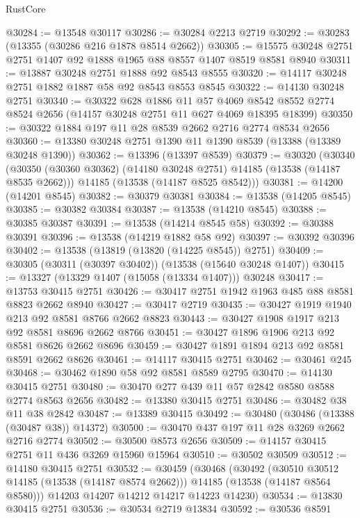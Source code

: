 \begin{lexlean}{RustCore}
\begin{coremodule}
@30284 := @13548 @30117
@30286 := @30284 @2213 @2719
@30292 := @30283 (@13355 (@30286 @216 @1878 @8514 @2662))
@30305 := @15575 @30248 @2751 @2751 @1407 @92 @1888 @1965 @88 @8557 @1407 @8519 @8581 @8940
@30311 := @13887 @30248 @2751 @1888 @92 @8543 @8555
@30320 := @14117 @30248 @2751 @1882 @1887 @58 @92 @8543 @8553 @8545
@30322 := @14130 @30248 @2751
@30340 := @30322
    @628
    @1886
    @11
    @57
    @4069
    @8542
    @8552
    @2774
    @8524
    @2656
    (@14157 @30248 @2751 @11 @627 @4069 @18395 @18399)
@30350 := @30322 @1884 @197 @11 @28 @8539 @2662 @2716 @2774 @8534 @2656
@30360 := @13380 @30248 @2751 @1390 @11 @1390 @8539 (@13388 (@13389 @30248 @1390))
@30362 := @13396 (@13397 @8539)
@30379 := @30320
    (@30340
      (@30350 (@30360 @30362) (@14180 @30248 @2751) @14185 (@13538 (@14187 @8535 @2662)))
      @14185
      (@13538 (@14187 @8525 @8542)))
@30381 := @14200 (@14201 @8545)
@30382 := @30379 @30381
@30384 := @13538 (@14205 @8545)
@30385 := @30382 @30384
@30387 := @13538 (@14210 @8545)
@30388 := @30385 @30387
@30391 := @13538 (@14214 @8545 @58)
@30392 := @30388 @30391
@30396 := @13538 (@14219 @1882 @58 @92)
@30397 := @30392 @30396
@30402 := @13538 (@13819 (@13820 (@14225 @8545)) @2751)
@30409 := @30305 (@30311 (@30397 @30402)) (@13538 (@15640 @30248 @1407))
@30415 := @13327 (@13329 @1407 (@15058 (@13334 @1407))) @30248
@30417 := @13753 @30415 @2751
@30426 := @30417 @2751 @1942 @1963 @485 @88 @8581 @8823 @2662 @8940
@30427 := @30417 @2719
@30435 := @30427 @1919 @1940 @213 @92 @8581 @8766 @2662 @8823
@30443 := @30427 @1908 @1917 @213 @92 @8581 @8696 @2662 @8766
@30451 := @30427 @1896 @1906 @213 @92 @8581 @8626 @2662 @8696
@30459 := @30427 @1891 @1894 @213 @92 @8581 @8591 @2662 @8626
@30461 := @14117 @30415 @2751
@30462 := @30461 @245
@30468 := @30462 @1890 @58 @92 @8581 @8589 @2795
@30470 := @14130 @30415 @2751
@30480 := @30470 @277 @439 @11 @57 @2842 @8580 @8588 @2774 @8563 @2656
@30482 := @13380 @30415 @2751
@30486 := @30482 @38 @11 @38 @2842
@30487 := @13389 @30415
@30492 := @30480 (@30486 (@13388 (@30487 @38)) @14372)
@30500 := @30470 @437 @197 @11 @28 @3269 @2662 @2716 @2774
@30502 := @30500 @8573 @2656
@30509 := @14157 @30415 @2751 @11 @436 @3269 @15960 @15964
@30510 := @30502 @30509
@30512 := @14180 @30415 @2751
@30532 := @30459
    (@30468
      (@30492
        (@30510 @30512 @14185 (@13538 (@14187 @8574 @2662)))
        @14185
        (@13538 (@14187 @8564 @8580)))
      @14203
      @14207
      @14212
      @14217
      @14223
      @14230)
@30534 := @13830 @30415 @2751
@30536 := @30534 @2719 @13834
@30592 := @30536
    @8591

\end{coremodule}
\end{lexlean}
